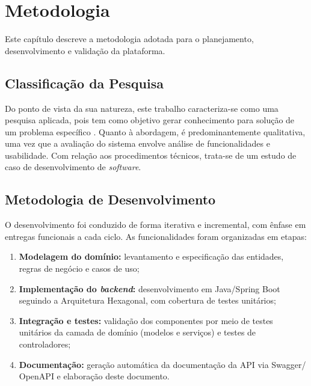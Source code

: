 
\chapter{Metodologia}
\label{cap:metodologia}

Este capítulo descreve a metodologia adotada para o planejamento, desenvolvimento
e validação da plataforma.

\section{Classificação da Pesquisa}
\label{sec:classificacao-pesquisa}

Do ponto de vista da sua natureza, este trabalho caracteriza-se como uma pesquisa
aplicada, pois tem como objetivo gerar conhecimento para solução de um problema
específico \cite{[REFERENCIA_METODOLOGIA]}. Quanto à abordagem, é predominantemente
qualitativa, uma vez que a avaliação do sistema envolve análise de funcionalidades
e usabilidade. Com relação aos procedimentos técnicos, trata-se de um estudo de
caso de desenvolvimento de \textit{software}.

\section{Metodologia de Desenvolvimento}
\label{sec:metodologia-desenvolvimento}

O desenvolvimento foi conduzido de forma iterativa e incremental, com ênfase
em entregas funcionais a cada ciclo. As funcionalidades foram organizadas em
etapas:

\begin{enumerate}
  \item \textbf{Modelagem do domínio:} levantamento e especificação das entidades,
        regras de negócio e casos de uso;

  \item \textbf{Implementação do \textit{backend}:} desenvolvimento em Java/Spring Boot
        seguindo a Arquitetura Hexagonal, com cobertura de testes unitários;

  \item \textbf{Integração e testes:} validação dos componentes por meio de testes
        unitários da camada de domínio (modelos e serviços) e testes de controladores;

  \item \textbf{Documentação:} geração automática da documentação da API via Swagger/
        OpenAPI e elaboração deste documento.
\end{enumerate}


